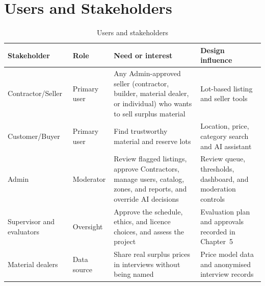 \section{Users and Stakeholders}
\begin{table}[H]
\centering
\caption{Users and stakeholders}
\label{tab:stakeholders}
\begin{tabularx}{\textwidth}{@{}p{}p{}X X@{}}
\toprule
\textbf{Stakeholder} & \textbf{Role} & \textbf{Need or interest} & \textbf{Design influence} \\
\midrule
Contractor/Seller & Primary user & Any Admin-approved seller (contractor, builder, material dealer, or individual) who wants to sell surplus material & Lot-based listing and seller tools \\
Customer/Buyer & Primary user & Find trustworthy material and reserve lots & Location, price, category search and AI assistant \\
Admin & Moderator & Review flagged listings, approve Contractors, manage users, catalog, zones, and reports, and override AI decisions & Review queue, thresholds, dashboard, and moderation controls \\
Supervisor and evaluators & Oversight & Approve the schedule, ethics, and licence choices, and assess the project & Evaluation plan and approvals recorded in Chapter~5 \\
Material dealers & Data source & Share real surplus prices in interviews without being named & Price model data and anonymised interview records \\
\bottomrule
\end{tabularx}
\end{table}

